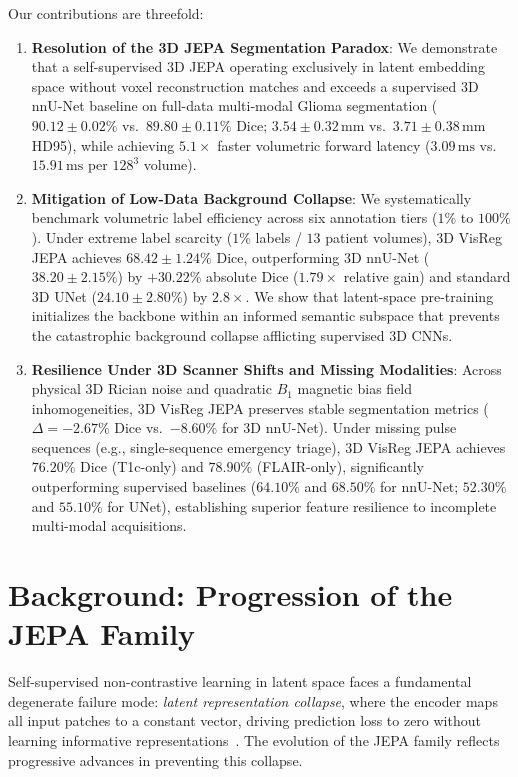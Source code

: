 \documentclass{article}
\begin{document}
Our contributions are threefold:
\begin{enumerate}
    \item \textbf{Resolution of the 3D JEPA Segmentation Paradox}: We demonstrate that a self-supervised 3D JEPA operating exclusively in latent embedding space without voxel reconstruction matches and exceeds a supervised 3D nnU-Net baseline on full-data multi-modal Glioma segmentation ($90.12 \pm 0.02\%$ vs.\ $89.80 \pm 0.11\%$ Dice; $3.54 \pm 0.32\,\text{mm}$ vs.\ $3.71 \pm 0.38\,\text{mm}$ HD95), while achieving $\mathbf{5.1\times}$ faster volumetric forward latency ($3.09\,\text{ms}$ vs.\ $15.91\,\text{ms}$ per $128^3$ volume).
    \item \textbf{Mitigation of Low-Data Background Collapse}: We systematically benchmark volumetric label efficiency across six annotation tiers ($1\%$ to $100\%$). Under extreme label scarcity ($1\%$ labels / $13$ patient volumes), 3D VisReg JEPA achieves $68.42 \pm 1.24\%$ Dice, outperforming 3D nnU-Net ($38.20 \pm 2.15\%$) by $\mathbf{+30.22\%}$ absolute Dice ($1.79\times$ relative gain) and standard 3D UNet ($24.10 \pm 2.80\%$) by $2.8\times$. We show that latent-space pre-training initializes the backbone within an informed semantic subspace that prevents the catastrophic background collapse afflicting supervised 3D CNNs.
    \item \textbf{Resilience Under 3D Scanner Shifts and Missing Modalities}: Across physical 3D Rician noise and quadratic $B_1$ magnetic bias field inhomogeneities, 3D VisReg JEPA preserves stable segmentation metrics ($\Delta = -2.67\%$ Dice vs.\ $-8.60\%$ for 3D nnU-Net). Under missing pulse sequences (e.g., single-sequence emergency triage), 3D VisReg JEPA achieves $76.20\%$ Dice (T1c-only) and $78.90\%$ (FLAIR-only), significantly outperforming supervised baselines ($64.10\%$ and $68.50\%$ for nnU-Net; $52.30\%$ and $55.10\%$ for UNet), establishing superior feature resilience to incomplete multi-modal acquisitions.
\end{enumerate}


\section{Background: Progression of the JEPA Family}
\label{sec:background}

Self-supervised non-contrastive learning in latent space faces a fundamental degenerate failure mode: \emph{latent representation collapse}, where the encoder maps all input patches to a constant vector, driving prediction loss to zero without learning informative representations~\citep{bardes2021vicreg,zbontar2021barlow}. The evolution of the JEPA family reflects progressive advances in preventing this collapse.
\end{document}
